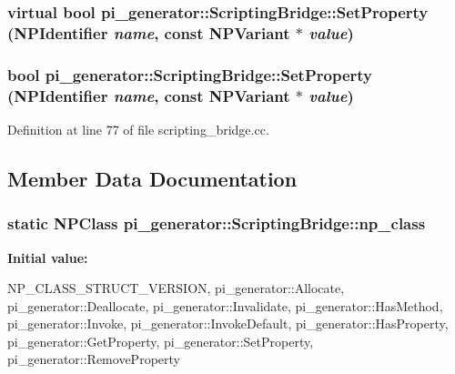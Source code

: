 \hypertarget{classpi__generator_1_1_scripting_bridge_a81c45706acaa62a4ba74cc2f0d0150c4}{
\subsubsection[{SetProperty}]{\setlength{\rightskip}{0pt plus 5cm}virtual bool pi\_\-generator::ScriptingBridge::SetProperty (NPIdentifier {\em name}, \/  const NPVariant $\ast$ {\em value})}}
\label{classpi__generator_1_1_scripting_bridge_a81c45706acaa62a4ba74cc2f0d0150c4}
\hypertarget{classpi__generator_1_1_scripting_bridge_aa87ffdeb58a36a1e352814132d4a020a}{
\subsubsection[{SetProperty}]{\setlength{\rightskip}{0pt plus 5cm}bool pi\_\-generator::ScriptingBridge::SetProperty (NPIdentifier {\em name}, \/  const NPVariant $\ast$ {\em value})}}
\label{classpi__generator_1_1_scripting_bridge_aa87ffdeb58a36a1e352814132d4a020a}


Definition at line 77 of file scripting\_\-bridge.cc.



\subsection{Member Data Documentation}
\hypertarget{classpi__generator_1_1_scripting_bridge_aed4a415c7f15933562413031d458792e}{
\subsubsection[{np\_\-class}]{\setlength{\rightskip}{0pt plus 5cm}static NPClass {\bf pi\_\-generator::ScriptingBridge::np\_\-class}}}
\label{classpi__generator_1_1_scripting_bridge_aed4a415c7f15933562413031d458792e}
{\bfseries Initial value:}
\begin{DoxyCode}
 {
  NP_CLASS_STRUCT_VERSION,
  pi_generator::Allocate,
  pi_generator::Deallocate,
  pi_generator::Invalidate,
  pi_generator::HasMethod,
  pi_generator::Invoke,
  pi_generator::InvokeDefault,
  pi_generator::HasProperty,
  pi_generator::GetProperty,
  pi_generator::SetProperty,
  pi_generator::RemoveProperty
}
\end{DoxyCode}


